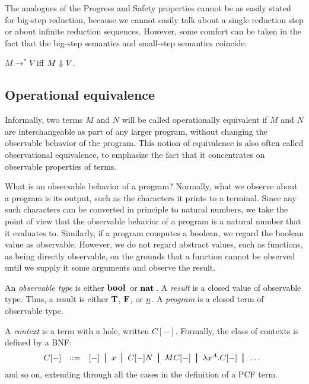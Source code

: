 \documentclass{article}
\begin{document}
The analogues of the Progress and Safety properties cannot be as
easily stated for big-step reduction, because we cannot easily talk
about a single reduction step or about infinite reduction sequences. 
However, some comfort can be taken in the fact that the big-step
semantics and small-step semantics coincide:

\begin{proposition}\label{prop-big-small}
  $M\to^* V$ iff $M\Downarrow V$.
\end{proposition}
 
\subsection{Operational equivalence}

Informally, two terms $M$ and $N$ will be called operationally
equivalent if $M$ and $N$ are interchangeable as part of any larger
program, without changing the observable behavior of the program. This
notion of equivalence is also often called observational equivalence,
to emphasize the fact that it concentrates on observable properties of
terms.

What is an observable behavior of a program? Normally, what we observe
about a program is its output, such as the characters it prints to a
terminal. Since any such characters can be converted in principle to
natural numbers, we take the point of view that the observable
behavior of a program is a natural number that it evaluates to. 
Similarly, if a program computes a boolean, we regard the boolean
value as observable. However, we do not regard abstract values, such
as functions, as being directly observable, on the grounds that a
function cannot be observed until we supply it some arguments and
observe the result.

\begin{definition}
  An {\em observable type} is either $\mathop{\textbf{\bf bool}\,}$ or $\mathop{\textbf{\bf nat}\,}$. A {\em
  result} is a closed value of observable type. Thus, a result is
  either ${\bf T}$, ${\bf F}$, or $\underline{n}$.  A {\em program} is a closed
  term of observable type. 

  A {\em context} is a term with a hole, written $C[-]$. Formally, the
  class of contexts is defined by a BNF:
  \[ \begin{array}{@{}lll}
    C[-] &\bnf&
    [-] \bor x \bor C[-]N \bor MC[-] \bor \lamabs{x}{A}.C[-]
    \bor \ldots
  \end{array}
  \]
  and so on, extending through all the cases in the definition of a
  PCF term. 
\end{definition}
\end{document}
